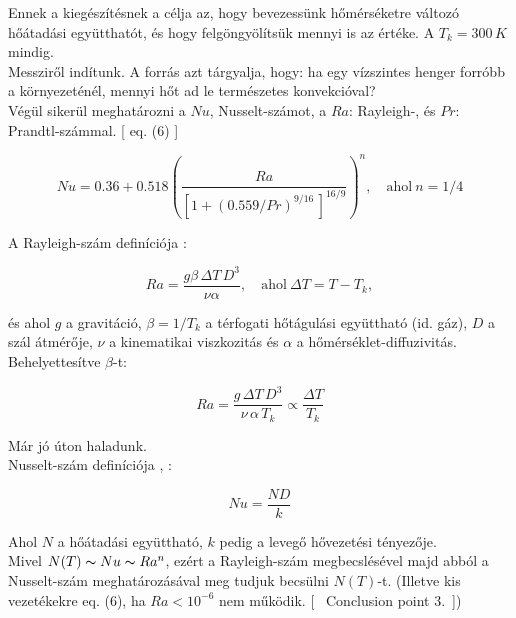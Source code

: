 \documentclass[a4paper, 10pt, oneside]{article}
\begin{document}
Ennek a kiegészítésnek a célja az, hogy bevezessünk hőmérséketre változó hőátadási együtthatót, 
és hogy felgöngyölítsük mennyi is az értéke. A $T_k = 300\, K$ mindig.\\

Messziről indítunk.
A \cite{Churchill} forrás azt tárgyalja, hogy: ha egy vízszintes henger forróbb a környezeténél, mennyi hőt ad le természetes konvekcióval?\\
Végül sikerül meghatározni a $Nu$, Nusselt-számot, a $Ra$: Rayleigh-, és $Pr$: Prandtl-számmal. [ \cite{Churchill} eq. (6) ]

\begin{equation}
	Nu = 0.36 + 0.518 \left( \frac{Ra}{[1+(0.559/Pr)^{9/16}\, ]^{16/9}} \right)^{n}, \quad \mathrm{ahol}\ n=1/4
	\label{NU-def}
\end{equation}

A Rayleigh-szám definíciója \cite{Rayleigh}:

\begin{equation*}
	Ra = \frac{g\beta\, \Delta T\, D^3}{\nu \alpha}, \quad \mathrm{ahol}\ \Delta T = T-T_k,
\end{equation*}

és ahol $g$ a gravitáció, $\beta = 1/T_k$ a térfogati hőtágulási együttható (id. gáz), $D$ a szál átmérője, $\nu$ a kinematikai viszkozitás
és $\alpha$ a hőmérséklet-diffuzivitás.\\
Behelyettesítve $\beta$-t:

\begin{equation*}
	Ra = \frac{g\, \Delta T\, D^3}{\nu\, \alpha\, T_k} \varpropto \frac{\Delta T}{T_k}
\end{equation*}

\noindent Már jó úton haladunk.\\
\indent Nusselt-szám definíciója \cite{Nusselt-def}, \cite{Nusselt-def-wiki}:

\[
Nu = \frac{N D}{k}
\]

Ahol $N$ a hőátadási együttható, $k$ pedig a levegő hővezetési tényezője.\\


Mivel $N(T) \thicksim Nu \thicksim Ra^n$, ezért a Rayleigh-szám megbecslésével majd abból a Nusselt-szám 
meghatározásával meg tudjuk becsülni $N(T)$-t. (Illetve kis vezetékekre \cite{Churchill} eq. (6), 
ha $Ra < 10^{-6}$ nem működik. [\ \cite{Churchill} Conclusion point 3.\ ])


\end{document}
